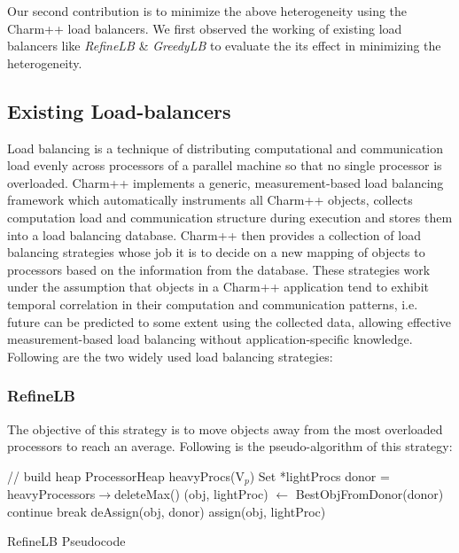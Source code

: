 Our second contribution is to minimize the above heterogeneity using the
Charm++ load balancers.  We first observed the working of existing load
balancers like \emph{RefineLB} \& \emph{GreedyLB} to evaluate the its effect in
minimizing the heterogeneity. 
 
\subsection{Existing Load-balancers} Load balancing is a technique of
distributing computational and communication load evenly across processors of a
parallel machine so that no single processor is overloaded.  Charm++ implements
a generic, measurement-based load balancing framework which automatically
instruments all Charm++ objects, collects computation load and communication
structure during execution and stores them into a load balancing database.
Charm++ then provides a collection of load balancing strategies whose job it is
to decide on a new mapping of objects to processors based on the information
from the database.  These strategies work under the assumption that objects in
a Charm++ application tend to exhibit temporal correlation in their computation
and communication patterns, i.e. future can be predicted to some extent using
the collected data, allowing effective measurement-based load balancing without
application-specific knowledge. Following are the two widely used load
balancing strategies:

\subsubsection{RefineLB}
The objective of this strategy is to move objects away from the most overloaded
processors to reach an average. Following is the pseudo-algorithm of this
strategy:

\begin{algorithm}
 // build heap \;
  ProcessorHeap heavyProcs(V$_p$)\;
  Set *lightProcs\;
   {
    donor =   heavyProcessors$\rightarrow$deleteMax()\;
     {
      (obj, lightProc)  $\leftarrow$ BestObjFromDonor(donor)\;
       {
        continue\;
      } 
       {
        break\;
      }
      deAssign(obj, donor)\;
      assign(obj, lightProc)\;
    }
  }
 \caption{RefineLB Pseudocode}
\end{algorithm}

